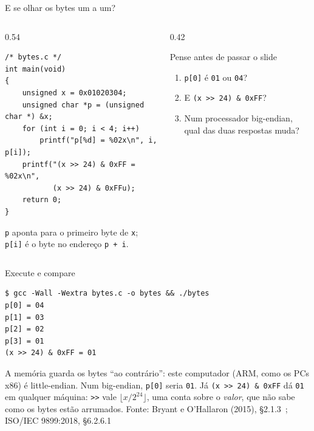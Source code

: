 \documentclass[aspectratio=169]{beamer}
\newcommand{\fonte}[1]{\vfill\hfill{\scriptsize\textcolor{UFSGray}{Fonte: #1}}}
\begin{document}
\begin{frame}[fragile]{E se olhar os bytes um a um?}
  \begin{columns}[c]
    \begin{column}{0.54\textwidth}
\begin{lstlisting}[style=codC]
/* bytes.c */
int main(void)
{
    unsigned x = 0x01020304;
    unsigned char *p = (unsigned char *) &x;
    for (int i = 0; i < 4; i++)
        printf("p[%d] = %02x\n", i, p[i]);
    printf("(x >> 24) & 0xFF = %02x\n",
           (x >> 24) & 0xFFu);
    return 0;
}
\end{lstlisting}
      \small \texttt{p} aponta para o primeiro byte de \texttt{x}; \texttt{p[i]}
      é o byte no endereço \texttt{p + i}.
    \end{column}
    \begin{column}{0.42\textwidth}
      \begin{block}{Pense antes de passar o slide}
        \small
        \begin{enumerate}
          \item \texttt{p[0]} é \texttt{01} ou \texttt{04}?
          \item E \texttt{(x >{}> 24) \& 0xFF}?
          \item Num processador big-endian, qual das duas respostas muda?
        \end{enumerate}
      \end{block}
    \end{column}
  \end{columns}
\end{frame}

\begin{frame}[fragile]{Execute e compare}
\begin{lstlisting}[style=shellStyle]
$ gcc -Wall -Wextra bytes.c -o bytes && ./bytes
p[0] = 04
p[1] = 03
p[2] = 02
p[3] = 01
(x >> 24) & 0xFF = 01
\end{lstlisting}
  \small A memória guarda os bytes ``ao contrário'': este computador (ARM,
  como os PCs x86) é little-endian. Num big-endian,
  \texttt{p[0]} seria \texttt{01}. Já \texttt{(x >{}> 24) \& 0xFF} dá
  \texttt{01} em qualquer máquina: \texttt{>{}>} vale $\lfloor x / 2^{24}
  \rfloor$, uma conta sobre o \emph{valor}, que não sabe como os bytes estão
  arrumados.
  \fonte{Bryant e O'Hallaron (2015), §2.1.3~\cite{bryant2015computer};
    ISO/IEC 9899:2018, §6.2.6.1~\cite{iso2018c17}}
\end{frame}
\end{document}
